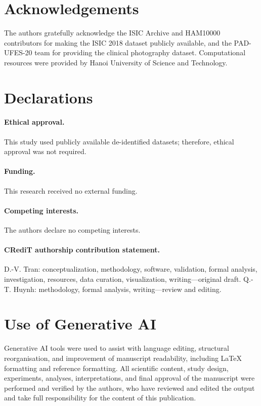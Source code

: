 \section*{Acknowledgements}

The authors gratefully acknowledge the ISIC Archive and HAM10000 contributors for making the ISIC 2018 dataset publicly available, and the PAD-UFES-20 team for providing the clinical photography dataset. Computational resources were provided by Hanoi University of Science and Technology.

\section*{Declarations}

\paragraph{Ethical approval.} This study used publicly available de-identified datasets; therefore, ethical approval was not required.

\paragraph{Funding.} This research received no external funding.

\paragraph{Competing interests.} The authors declare no competing interests.

\paragraph{CRediT authorship contribution statement.} D.-V. Tran: conceptualization, methodology, software, validation, formal analysis, investigation, resources, data curation, visualization, writing---original draft. Q.-T. Huynh: methodology, formal analysis, writing---review and editing.

\section*{Use of Generative AI}

Generative AI tools were used to assist with language editing, structural reorganisation, and improvement of manuscript readability, including LaTeX formatting and reference formatting. All scientific content, study design, experiments, analyses, interpretations, and final approval of the manuscript were performed and verified by the authors, who have reviewed and edited the output and take full responsibility for the content of this publication.

